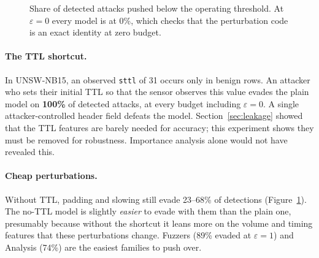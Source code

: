 \documentclass[11pt,a4paper]{article}
\newcommand{\code}[1]{\texttt{#1}}
\begin{document}
\begin{figure}[h]
\centering
{}
\caption{Share of detected attacks pushed below the operating threshold.
At $\varepsilon=0$ every model is at 0\%, which checks that the perturbation
code is an exact identity at zero budget.}
\label{fig:evasion}
\end{figure}

\paragraph{The TTL shortcut.} In UNSW-NB15, an observed \code{sttl} of 31
occurs only in benign rows. An attacker who sets their initial TTL so that
the sensor observes this value evades the plain model on \textbf{100\%} of
detected attacks, at every budget including $\varepsilon=0$. A single
attacker-controlled header field defeats the model. Section~\ref{sec:leakage}
showed that the TTL features are barely needed for accuracy; this experiment
shows they must be removed for robustness. Importance analysis alone would
not have revealed this.

\paragraph{Cheap perturbations.} Without TTL, padding and slowing still
evade 23--68\% of detections (Figure~\ref{fig:evasion}). The no-TTL model is
slightly \emph{easier} to evade with them than the plain one, presumably
because without the shortcut it leans more on the volume and timing features
that these perturbations change. Fuzzers (89\% evaded at
$\varepsilon=1$) and Analysis (74\%) are the easiest families to push over.
\end{document}

